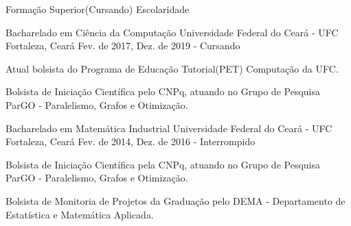

\begin{cventries}

  \cventry
    {Formação Superior(Cursando)} %
    {Escolaridade} %
    {} %
    {} %
    {
      \begin{cvitems} %
      \end{cvitems}
    }
  \cventry
    {Bacharelado em Ciência da Computação} %
    {Universidade Federal do Ceará - UFC} %
    {Fortaleza, Ceará} %
    {Fev. de 2017, Dez. de 2019 - Cursando} %
    {
      \begin{cvitems} %
        \item {Atual bolsista do Programa de Educação Tutorial(PET) Computação da UFC.}
        \item {Bolsista de Iniciação Científica pelo CNPq, atuando no Grupo de Pesquisa ParGO - Paralelismo, Grafos e Otimização.}        
      \end{cvitems}
    }

\vskip 0.4cm
  \cventry
    {Bacharelado em Matemática Industrial} %
    {Universidade Federal do Ceará - UFC} %
    {Fortaleza, Ceará} %
    {Fev. de 2014, Dez. de 2016 - Interrompido} %
    {
      \begin{cvitems} %
        \item {Bolsista de Iniciação Científica pela CNPq, atuando no Grupo de Pesquisa ParGO - Paralelismo, Grafos e Otimização.}
        \item {Bolsista de Monitoria de Projetos da Graduação pelo DEMA - Departamento de Estatística e Matemática Aplicada.}        
      \end{cvitems}
    }       


\end{cventries}
